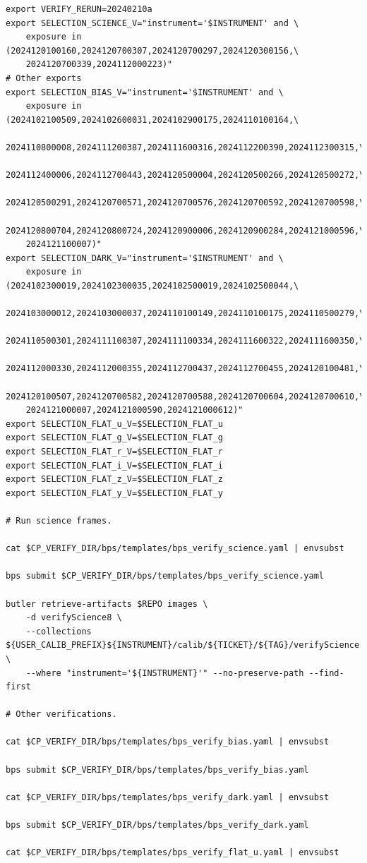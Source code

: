 \documentclass[DM,authoryear,toc]{lsstdoc}
\begin{document}
\begin{footnotesize}
\begin{verbatim}
export VERIFY_RERUN=20240210a
export SELECTION_SCIENCE_V="instrument='$INSTRUMENT' and \
    exposure in (2024120100160,2024120700307,2024120700297,2024120300156,\
    2024120700339,2024112000223)"
# Other exports
export SELECTION_BIAS_V="instrument='$INSTRUMENT' and \
    exposure in (2024102100509,2024102600031,2024102900175,2024110100164,\
    2024110800008,2024111200387,2024111600316,2024112200390,2024112300315,\
    2024112400006,2024112700443,2024120500004,2024120500266,2024120500272,\
    2024120500291,2024120700571,2024120700576,2024120700592,2024120700598,\
    2024120800704,2024120800724,2024120900006,2024120900284,2024121000596,\
    2024121100007)"
export SELECTION_DARK_V="instrument='$INSTRUMENT' and \
    exposure in (2024102300019,2024102300035,2024102500019,2024102500044,\
    2024103000012,2024103000037,2024110100149,2024110100175,2024110500279,\
    2024110500301,2024111100307,2024111100334,2024111600322,2024111600350,\
    2024112000330,2024112000355,2024112700437,2024112700455,2024120100481,\
    2024120100507,2024120700582,2024120700588,2024120700604,2024120700610,\
    2024121000007,2024121000590,2024121000612)"
export SELECTION_FLAT_u_V=$SELECTION_FLAT_u
export SELECTION_FLAT_g_V=$SELECTION_FLAT_g
export SELECTION_FLAT_r_V=$SELECTION_FLAT_r
export SELECTION_FLAT_i_V=$SELECTION_FLAT_i
export SELECTION_FLAT_z_V=$SELECTION_FLAT_z
export SELECTION_FLAT_y_V=$SELECTION_FLAT_y

# Run science frames.

cat $CP_VERIFY_DIR/bps/templates/bps_verify_science.yaml | envsubst

bps submit $CP_VERIFY_DIR/bps/templates/bps_verify_science.yaml

butler retrieve-artifacts $REPO images \
    -d verifyScience8 \
    --collections ${USER_CALIB_PREFIX}${INSTRUMENT}/calib/${TICKET}/${TAG}/verifyScience.${VERIFY_RERUN} \
    --where "instrument='${INSTRUMENT}'" --no-preserve-path --find-first

# Other verifications.

cat $CP_VERIFY_DIR/bps/templates/bps_verify_bias.yaml | envsubst

bps submit $CP_VERIFY_DIR/bps/templates/bps_verify_bias.yaml

cat $CP_VERIFY_DIR/bps/templates/bps_verify_dark.yaml | envsubst

bps submit $CP_VERIFY_DIR/bps/templates/bps_verify_dark.yaml

cat $CP_VERIFY_DIR/bps/templates/bps_verify_flat_u.yaml | envsubst


\end{verbatim}
\end{footnotesize}
\end{document}
